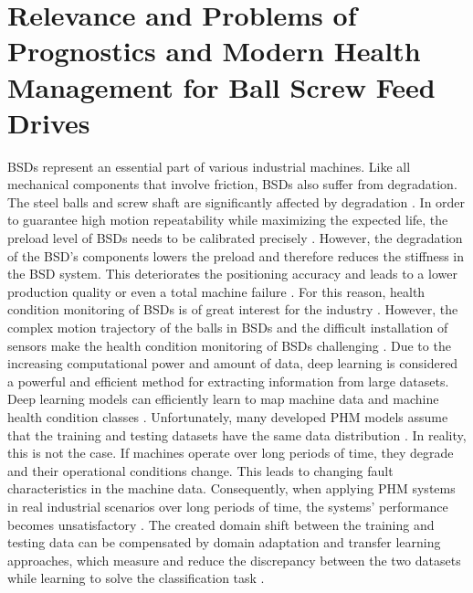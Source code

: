 \section{Relevance and Problems of Prognostics and Modern Health Management for Ball Screw Feed Drives}
BSDs represent an essential part of various industrial machines. Like all mechanical components that involve friction, BSDs also suffer from degradation. The steel balls and screw shaft are significantly affected by degradation \cite{Pandhare2021}. In order to guarantee high motion repeatability while maximizing the expected life, the preload level of BSDs needs to be calibrated precisely \cite{Pandhare2021}. However, the degradation of the BSD's components lowers the preload and therefore reduces the stiffness in the BSD system. This deteriorates the positioning accuracy and leads to a lower production quality or even a total machine failure \cite{Pandhare2021}. For this reason, health condition monitoring of BSDs is of great interest for the industry \cite{Pandhare2021}. However, the complex motion trajectory of the balls in BSDs and the difficult installation of sensors make the health condition monitoring of BSDs challenging \cite{LiPin2018}. Due to the increasing computational power and amount of data, deep learning is considered a powerful and efficient method for extracting information from large datasets. Deep learning models can efficiently learn to map machine data and machine health condition classes \cite{ZHAO2019213}. Unfortunately, many developed PHM models assume that the training and testing datasets have the same data distribution \cite{AZAMFAR2020103932}. In reality, this is not the case. If machines operate over long periods of time, they degrade and their operational conditions change. This leads to changing fault characteristics in the machine data. Consequently, when applying PHM systems in real industrial scenarios over long periods of time, the systems' performance becomes unsatisfactory \cite{AZAMFAR2020103932}. The created domain shift between the training and testing data can be compensated by domain adaptation and transfer learning approaches, which measure and reduce the discrepancy between the two datasets while learning to solve the classification task \cite{AZAMFAR2020103932}.


